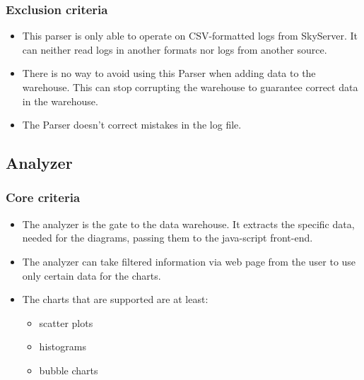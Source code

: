  
\subsubsection{Exclusion criteria}
\begin{itemize}
\item This parser is only able to operate on CSV-formatted logs from SkyServer. 
It can neither read logs in another formats nor logs from another source.

\item There is no way to avoid using this Parser when adding data to the warehouse. 
This can stop corrupting the warehouse to guarantee correct data in the warehouse.

\item The Parser doesn't correct mistakes in the log file.
\end{itemize}



\subsection{Analyzer}

\subsubsection{Core criteria}
\begin{itemize}
\item The analyzer is the gate to the data warehouse. It extracts the specific data, 
needed for the diagrams, passing them to the java-script front-end.
\item The analyzer can take filtered information via web page from the user 
to use only certain data for the charts.
\item The charts that are supported are at least:
\begin{itemize}
\item scatter plots
\item histograms
\item bubble charts
\end{itemize}

\end{itemize}


